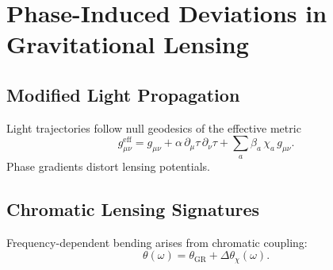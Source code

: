 \chapter{Phase-Induced Deviations in Gravitational Lensing}

\section{Modified Light Propagation}
Light trajectories follow null geodesics of the effective metric
\[
g_{\mu\nu}^{\mathrm{eff}} = g_{\mu\nu} + \alpha\,\partial_\mu\tau\,\partial_\nu\tau 
+ \sum_a \beta_a\,\chi_a\,g_{\mu\nu}.
\]
Phase gradients distort lensing potentials.

\section{Chromatic Lensing Signatures}
Frequency-dependent bending arises from chromatic coupling:
\[
\theta(\omega)=\theta_{\mathrm{GR}}+\Delta\theta_{\chi}(\omega).
\]

